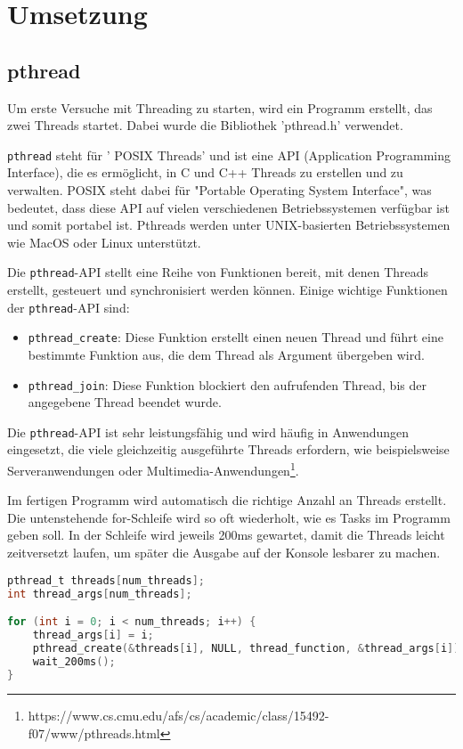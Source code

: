 \chapter{Umsetzung}
\label{cha:Umsetzung}
\section{pthread}
Um erste Versuche mit Threading zu starten, wird ein Programm erstellt, das zwei Threads startet. 
Dabei wurde die Bibliothek 'pthread.h' verwendet. 

\texttt{pthread} steht für ' POSIX Threads' und ist eine API (Application Programming Interface), die es ermöglicht, in C und C++ Threads zu erstellen und zu verwalten. POSIX steht dabei für "Portable Operating System Interface", was bedeutet, dass diese API auf vielen verschiedenen Betriebssystemen verfügbar ist und somit portabel ist. Pthreads werden unter UNIX-basierten Betriebssystemen wie MacOS oder Linux unterstützt. 

Die \texttt{pthread}-API stellt eine Reihe von Funktionen bereit, mit denen Threads erstellt, gesteuert und synchronisiert werden können. Einige wichtige Funktionen der \texttt{pthread}-API sind:

\begin{itemize}
\item \verb|pthread_create|: Diese Funktion erstellt einen neuen Thread und führt eine bestimmte Funktion aus, die dem Thread als Argument übergeben wird.
\item \verb|pthread_join|: Diese Funktion blockiert den aufrufenden Thread, bis der angegebene Thread beendet wurde.
\end{itemize}

Die \texttt{pthread}-API ist sehr leistungsfähig und wird häufig in Anwendungen eingesetzt, die viele gleichzeitig ausgeführte Threads erfordern, wie beispielsweise Serveranwendungen oder Multimedia-Anwendungen\footnote[2]{https://www.cs.cmu.edu/afs/cs/academic/class/15492-f07/www/pthreads.html}. 


Im fertigen Programm wird automatisch die richtige Anzahl an Threads erstellt. 
Die untenstehende for-Schleife wird so oft wiederholt, wie es Tasks im Programm geben soll.
In der Schleife wird jeweils 200ms gewartet, damit die Threads leicht zeitversetzt laufen, um später die Ausgabe auf der Konsole lesbarer zu machen.

\begin{lstlisting}[language=C]
pthread_t threads[num_threads];
int thread_args[num_threads];

for (int i = 0; i < num_threads; i++) {
	thread_args[i] = i;
	pthread_create(&threads[i], NULL, thread_function, &thread_args[i]); 
	wait_200ms();
}
\end{lstlisting}

